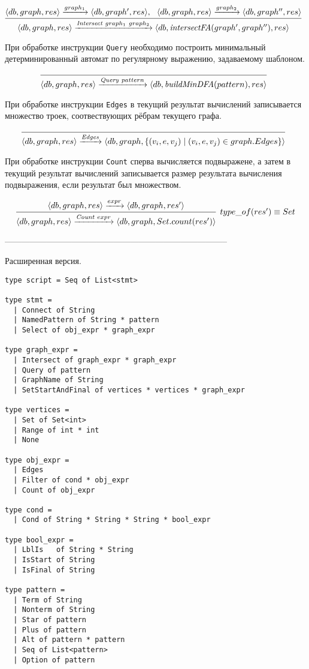 $$
\infer[]{\langle db, graph, res\rangle \xrightarrow{\textit{Intersect} \ graph_1 \ graph_2} \langle db, \textit{intersectFA}(graph', graph''), res\rangle}{\langle db, graph,res\rangle \xrightarrow{graph_1} \langle db, graph', res \rangle, \ \ \langle db, graph,res \rangle \xrightarrow{graph_2} \langle db, graph'', res \rangle}
$$


При обработке инструкции \verb|Query| необходимо построить минимальный детерминированный автомат по регулярному выражению, задаваемому шаблоном.

$$
\infer[]{\langle db, graph, res \rangle \xrightarrow{\textit{Query} \ pattern} \langle db, \textit{buildMinDFA}(pattern), res \rangle}{}
$$

При обработке инструкции \verb|Edges| в текущий результат вычислений записывается множество троек, соотвествующих рёбрам текущего графа.

$$
\infer[]{\langle db, graph, res \rangle \xrightarrow{\textit{Edges}} \langle db, graph, \{(v_i,e,v_j) \mid (v_i,e,v_j) \in graph.Edges\}\rangle}{}
$$

При обработке инструкции \verb|Count| сперва вычисляется подвыражене, а затем в текущий результат вычислений записывается размер результата вычисления подвыражения, если результат был множеством.

$$
\infer[type\_of(res') \equiv Set ]{\langle db, graph, res \rangle \xrightarrow{\textit{Count} \ expr} \langle db, graph, Set.count(res') \rangle}{\langle db, graph, res \rangle \xrightarrow{expr} \langle db, graph, res' \rangle}
$$

--------------------------------------------------------------------------------




Расширенная версия.

\begin{verbatim}
type script = Seq of List<stmt>

type stmt =
  | Connect of String
  | NamedPattern of String * pattern
  | Select of obj_expr * graph_expr

type graph_expr =
  | Intersect of graph_expr * graph_expr 
  | Query of pattern
  | GraphName of String
  | SetStartAndFinal of vertices * vertices * graph_expr

type vertices =
  | Set of Set<int>
  | Range of int * int
  | None   

type obj_expr =
  | Edges
  | Filter of cond * obj_expr
  | Count of obj_expr
  
type cond = 
  | Cond of String * String * String * bool_expr

type bool_expr = 
  | LblIs   of String * String
  | IsStart of String
  | IsFinal of String

type pattern = 
  | Term of String
  | Nonterm of String
  | Star of pattern
  | Plus of pattern
  | Alt of pattern * pattern
  | Seq of List<pattern>
  | Option of pattern

\end{verbatim}


